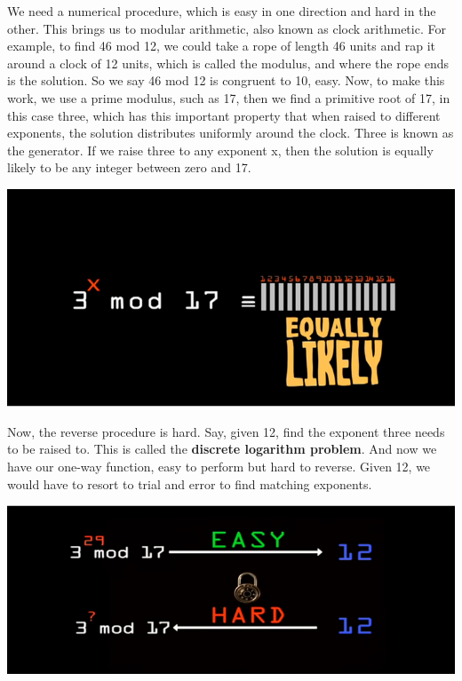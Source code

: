 \documentclass{report}
\begin{document}
We need a numerical procedure, which is easy in one direction and hard in the other. This brings us to modular arithmetic, also known as clock arithmetic. For example, to find 46 mod 12, we could take a rope of length 46 units and rap it around a clock of 12 units, which is called the modulus, and where the rope ends is the solution. So we say 46 mod 12 is congruent to 10, easy. Now, to make this work, we use a prime modulus, such as 17, then we find a primitive root of 17, in this case three, which has this important property that when raised to different exponents, the solution distributes uniformly around the clock. Three is known as the generator. If we raise three to any exponent x, then the solution is equally likely to be any integer between zero and 17.
\begin{center}
	\includegraphics[scale=1]{26.png}
\end{center}
Now, the reverse procedure is hard. Say, given 12, find the exponent three needs to be raised to. This is called the\textbf{ discrete logarithm problem}.
And now we have our one-way function, easy to perform but hard to reverse. Given 12, we would have to resort to trial and error to find matching exponents. 
\begin{center}
	\includegraphics[scale=1]{27.png}
\end{center}
\end{document}
